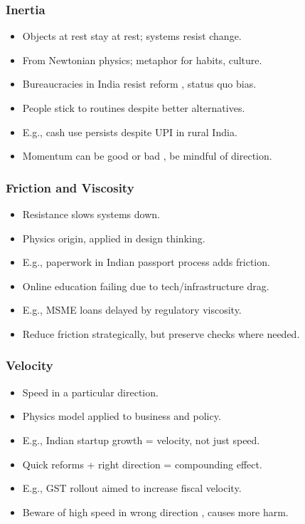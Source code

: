 \begin{frame}[fragile]\frametitle{Inertia}
  \begin{itemize}
    \item Objects at rest stay at rest; systems resist change.
    \item From Newtonian physics; metaphor for habits, culture.
    \item Bureaucracies in India resist reform , status quo bias.
    \item People stick to routines despite better alternatives.
    \item E.g., cash use persists despite UPI in rural India.
    \item Momentum can be good or bad , be mindful of direction.
  \end{itemize}
\end{frame}

\begin{frame}[fragile]\frametitle{Friction and Viscosity}
  \begin{itemize}
    \item Resistance slows systems down.
    \item Physics origin, applied in design thinking.
    \item E.g., paperwork in Indian passport process adds friction.
    \item Online education failing due to tech/infrastructure drag.
    \item E.g., MSME loans delayed by regulatory viscosity.
    \item Reduce friction strategically, but preserve checks where needed.
  \end{itemize}
\end{frame}

\begin{frame}[fragile]\frametitle{Velocity}
  \begin{itemize}
    \item Speed in a particular direction.
    \item Physics model applied to business and policy.
    \item E.g., Indian startup growth = velocity, not just speed.
    \item Quick reforms + right direction = compounding effect.
    \item E.g., GST rollout aimed to increase fiscal velocity.
    \item Beware of high speed in wrong direction , causes more harm.
  \end{itemize}
\end{frame}

